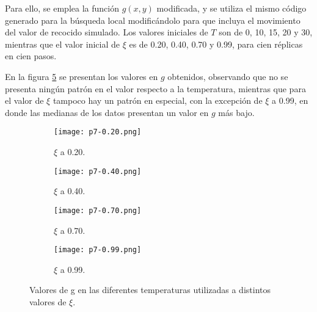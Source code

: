 \documentclass{article}
\begin{document}
Para ello, se emplea la función $g(x,y)$ modificada, y se utiliza el mismo código generado para la búsqueda local \cite{clara}\cite{ric} modificándolo para que incluya el movimiento del valor de recocido simulado. Los valores iniciales de $T$ son de 0, 10, 15, 20 y 30, mientras que el valor inicial de $\xi$ es de 0.20, 0.40, 0.70 y 0.99, para cien réplicas en cien pasos.

En la figura \ref{recocido} se presentan los valores en $g$ obtenidos, observando que no se presenta ningún patrón en el valor respecto a la temperatura, mientras que para el valor de $\xi$ tampoco hay un patrón en especial, con la excepción de $\xi$ a 0.99, en donde las medianas de los datos presentan un valor en $g$ más bajo.

\begin{figure}
\centering
\begin{subfigure}[b]{0.4\linewidth}
\texttt{[image: p7-0.20.png]}
\caption{$\xi$ a 0.20.}
\label{f1}
\end{subfigure}
\begin{subfigure}[b]{0.4\linewidth}
\texttt{[image: p7-0.40.png]}
\caption{$\xi$ a 0.40.}
\label{f1d}
\end{subfigure}
\begin{subfigure}[b]{0.4\linewidth}
\texttt{[image: p7-0.70.png]}
\caption{$\xi$ a 0.70.}
\label{f2}
\end{subfigure}
\begin{subfigure}[b]{0.4\linewidth}
\texttt{[image: p7-0.99.png]}
\caption{$\xi$ a 0.99.}
\label{f2d}
\end{subfigure}
\caption{Valores de g en las diferentes temperaturas utilizadas a distintos valores de $\xi$.}
\label{recocido}
\end{figure}



\end{document}
